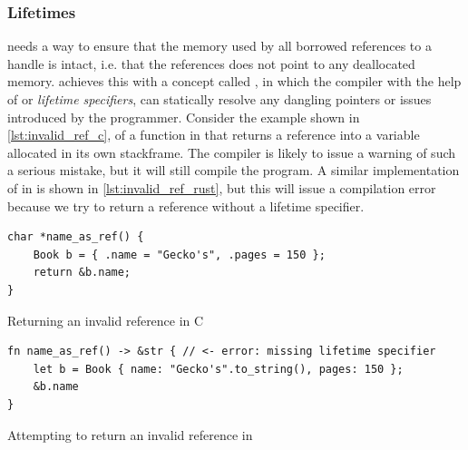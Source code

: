 \subsubsection{Lifetimes}
\label{ssec:lifetimes}

\rust needs a way to ensure that the memory used by all borrowed references to a handle is intact, i.e. that the references does not point to any deallocated memory.
\rust achieves this with a concept called , in which the compiler with the help of  or \emph{lifetime specifiers}, can statically resolve any dangling pointers or  issues introduced by the programmer.
Consider the example shown in \autoref{lst:invalid_ref_c}, of a function in {\C} that returns a reference into a variable allocated in its own stackframe.
The {\C} compiler is likely to issue a warning of such a serious mistake, but it will still compile the program.
A similar implementation of  in {\rust} is shown in \autoref{lst:invalid_ref_rust}, but this will issue a compilation error because we try to return a reference without a lifetime specifier.

\begin{listing}[tb]
\begin{verbatim}
char *name_as_ref() {
    Book b = { .name = "Gecko's", .pages = 150 };
    return &b.name;
}
\end{verbatim}
\caption{Returning an invalid reference in C}
\label{lst:invalid_ref_c}
\end{listing}

\begin{listing}[tb]
\begin{verbatim}
fn name_as_ref() -> &str { // <- error: missing lifetime specifier
    let b = Book { name: "Gecko's".to_string(), pages: 150 };
    &b.name
}
\end{verbatim}
\caption{Attempting to return an invalid reference in {\rust}}
\label{lst:invalid_ref_rust}
\end{listing}

